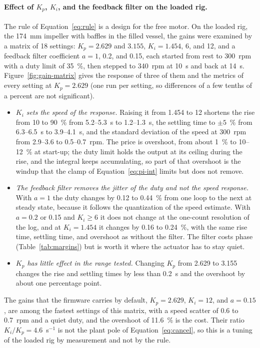 \paragraph{Effect of $K_p$, $K_i$, and the feedback filter on the loaded rig.}
The rule of Equation~\ref{eq:rule} is a design for the free motor. On the loaded rig, the 174~mm impeller with baffles in the filled vessel, the gains were examined by a matrix of 18 settings: $K_p = 2.629$ and $3.155$, $K_i = 1.454$, 6, and 12, and a feedback filter coefficient $a = 1$, 0.2, and 0.15, each started from rest to 300~rpm with a duty limit of 35~\%, then stepped to 340~rpm at 10~s and back at 14~s. Figure~\ref{fig:gain-matrix} gives the response of three of them and the metrics of every setting at $K_p = 2.629$ (one run per setting, so differences of a few tenths of a percent are not significant).
\begin{itemize}
    \item \emph{$K_i$ sets the speed of the response.} Raising it from 1.454 to 12 shortens the rise from 10 to 90~\% from 5.2--5.3~s to 1.2--1.3~s, the settling time to $\pm 5$~\% from 6.3--6.5~s to 3.9--4.1~s, and the standard deviation of the speed at 300~rpm from 2.9--3.6 to 0.5--0.7~rpm. The price is overshoot, from about 1~\% to 10--12~\% at start-up; the duty limit holds the output at its ceiling during the rise, and the integral keeps accumulating, so part of that overshoot is the windup that the clamp of Equation~\ref{eq:pi-int} limits but does not remove.
    \item \emph{The feedback filter removes the jitter of the duty and not the speed response.} With $a = 1$ the duty changes by 0.12 to 0.44~\% from one loop to the next at steady state, because it follows the quantization of the speed estimate. With $a = 0.2$ or 0.15 and $K_i \geq 6$ it does not change at the one-count resolution of the log, and at $K_i = 1.454$ it changes by 0.16 to 0.24~\%, with the same rise time, settling time, and overshoot as without the filter. The filter costs phase (Table~\ref{tab:margins}) but is worth it where the actuator has to stay quiet.
    \item \emph{$K_p$ has little effect in the range tested.} Changing $K_p$ from 2.629 to 3.155 changes the rise and settling times by less than 0.2~s and the overshoot by about one percentage point.
\end{itemize}
The gains that the firmware carries by default, $K_p = 2.629$, $K_i = 12$, and $a = 0.15$, are among the fastest settings of this matrix, with a speed scatter of 0.6 to 0.7~rpm and a quiet duty, and the overshoot of 11.6~\% is the cost. Their ratio $K_i/K_p = 4.6$~s$^{-1}$ is not the plant pole of Equation~\ref{eq:cancel}, so this is a tuning of the loaded rig by measurement and not by the rule. %

